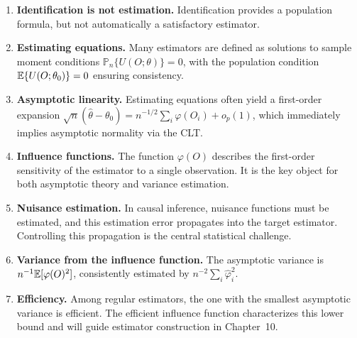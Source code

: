 \documentclass[master.tex]{subfiles}
\begin{document}
\begin{enumerate}
  \item \textbf{Identification is not estimation.}  Identification
    provides a population formula, but not automatically a satisfactory
    estimator.

  \item \textbf{Estimating equations.}  Many estimators are defined as
    solutions to sample moment conditions
    $\mathbb{P}_n\{U(O;\theta)\}=0$, with the population condition
    $\mathbb{E}\{U(O;\theta_0)\}=0$ ensuring consistency.

  \item \textbf{Asymptotic linearity.}  Estimating equations often
    yield a first-order expansion
    $\sqrt{n}(\hat\theta - \theta_0) = n^{-1/2}\sum_i\varphi(O_i) +
    o_p(1)$, which immediately implies asymptotic normality via the
    CLT.

  \item \textbf{Influence functions.}  The function $\varphi(O)$
    describes the first-order sensitivity of the estimator to a single
    observation.  It is the key object for both asymptotic theory and
    variance estimation.

  \item \textbf{Nuisance estimation.}  In causal inference, nuisance
    functions must be estimated, and this estimation error propagates
    into the target estimator.  Controlling this propagation is the
    central statistical challenge.

  \item \textbf{Variance from the influence function.}  The asymptotic
    variance is $n^{-1}\mathbb{E}[\varphi(O)^2]$, consistently estimated by
    $n^{-2}\sum_i\hat\varphi_i^2$.

  \item \textbf{Efficiency.}  Among regular estimators, the one with
    the smallest asymptotic variance is efficient.  The efficient
    influence function characterizes this lower bound and will guide
    estimator construction in Chapter~10.
\end{enumerate}
\end{document}
